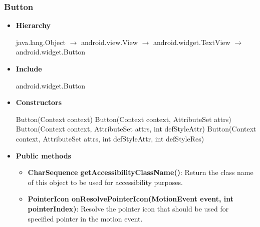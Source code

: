 \documentclass{report}
\begin{document}
    \subsubsection{Button}
    \begin{itemize}
        \item \textbf{Hierarchy} 
            \begin{center}
                java.lang.Object $\to$	android.view.View $\to$	android.widget.TextView $\to$	android.widget.Button
            \end{center}
        \item \textbf{Include}
            \bigbreak \noindent 
            \begin{javacode}
                android.widget.Button
            \end{javacode}
        \item \textbf{Constructors}
            \bigbreak \noindent 
            \begin{javacode}
                Button(Context context)
                Button(Context context, AttributeSet attrs)
                Button(Context context, AttributeSet attrs, int defStyleAttr)
                Button(Context context, AttributeSet attrs, int defStyleAttr, int defStyleRes)
            \end{javacode}
        \item \textbf{Public methods}
            \begin{itemize}
                \item \textbf{CharSequence getAccessibilityClassName()}: Return the class name of this object to be used for accessibility purposes.
                \item \textbf{PointerIcon onResolvePointerIcon(MotionEvent event, int pointerIndex)}: Resolve the pointer icon that should be used for specified pointer in the motion event.
            \end{itemize}

    \end{itemize}

    \pagebreak 
\end{document}

